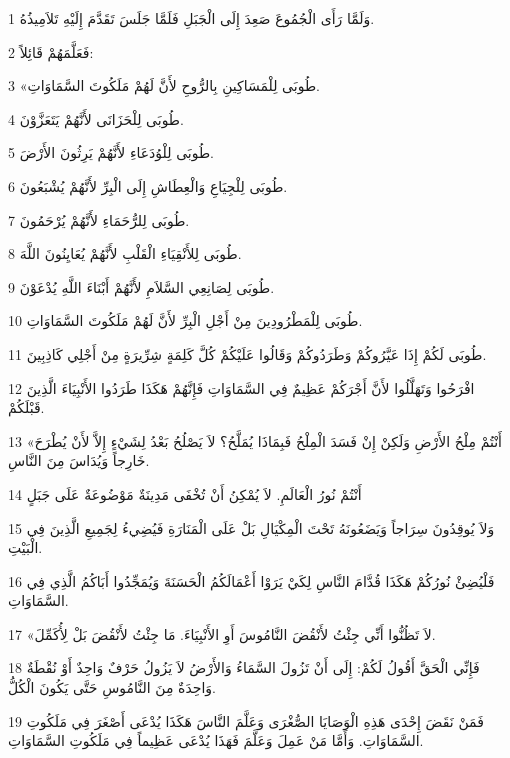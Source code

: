 \par 1 وَلَمَّا رَأَى الْجُمُوعَ صَعِدَ إِلَى الْجَبَلِ فَلَمَّا جَلَسَ تَقَدَّمَ إِلَيْهِ تَلاَمِيذُهُ.
\par 2 فَعَلَّمَهُمْ قَائِلاً:
\par 3 «طُوبَى لِلْمَسَاكِينِ بِالرُّوحِ لأَنَّ لَهُمْ مَلَكُوتَ السَّمَاوَاتِ.
\par 4 طُوبَى لِلْحَزَانَى لأَنَّهُمْ يَتَعَزَّوْنَ.
\par 5 طُوبَى لِلْوُدَعَاءِ لأَنَّهُمْ يَرِثُونَ الأَرْضَ.
\par 6 طُوبَى لِلْجِيَاعِ وَالْعِطَاشِ إِلَى الْبِرِّ لأَنَّهُمْ يُشْبَعُونَ.
\par 7 طُوبَى لِلرُّحَمَاءِ لأَنَّهُمْ يُرْحَمُونَ.
\par 8 طُوبَى لِلأَنْقِيَاءِ الْقَلْبِ لأَنَّهُمْ يُعَايِنُونَ اللَّهَ.
\par 9 طُوبَى لِصَانِعِي السَّلاَمِ لأَنَّهُمْ أَبْنَاءَ اللَّهِ يُدْعَوْنَ.
\par 10 طُوبَى لِلْمَطْرُودِينَ مِنْ أَجْلِ الْبِرِّ لأَنَّ لَهُمْ مَلَكُوتَ السَّمَاوَاتِ.
\par 11 طُوبَى لَكُمْ إِذَا عَيَّرُوكُمْ وَطَرَدُوكُمْ وَقَالُوا عَلَيْكُمْ كُلَّ كَلِمَةٍ شِرِّيرَةٍ مِنْ أَجْلِي كَاذِبِينَ.
\par 12 افْرَحُوا وَتَهَلَّلُوا لأَنَّ أَجْرَكُمْ عَظِيمٌ فِي السَّمَاوَاتِ فَإِنَّهُمْ هَكَذَا طَرَدُوا الأَنْبِيَاءَ الَّذِينَ قَبْلَكُمْ.
\par 13 «أَنْتُمْ مِلْحُ الأَرْضِ وَلَكِنْ إِنْ فَسَدَ الْمِلْحُ فَبِمَاذَا يُمَلَّحُ؟ لاَ يَصْلُحُ بَعْدُ لِشَيْءٍ إِلاَّ لأَنْ يُطْرَحَ خَارِجاً وَيُدَاسَ مِنَ النَّاسِ.
\par 14 أَنْتُمْ نُورُ الْعَالَمِ. لاَ يُمْكِنُ أَنْ تُخْفَى مَدِينَةٌ مَوْضُوعَةٌ عَلَى جَبَلٍ
\par 15 وَلاَ يُوقِدُونَ سِرَاجاً وَيَضَعُونَهُ تَحْتَ الْمِكْيَالِ بَلْ عَلَى الْمَنَارَةِ فَيُضِيءُ لِجَمِيعِ الَّذِينَ فِي الْبَيْتِ.
\par 16 فَلْيُضِئْ نُورُكُمْ هَكَذَا قُدَّامَ النَّاسِ لِكَيْ يَرَوْا أَعْمَالَكُمُ الْحَسَنَةَ وَيُمَجِّدُوا أَبَاكُمُ الَّذِي فِي السَّمَاوَاتِ.
\par 17 «لاَ تَظُنُّوا أَنِّي جِئْتُ لأَنْقُضَ النَّامُوسَ أَوِ الأَنْبِيَاءَ. مَا جِئْتُ لأَنْقُضَ بَلْ لِأُكَمِّلَ.
\par 18 فَإِنِّي الْحَقَّ أَقُولُ لَكُمْ: إِلَى أَنْ تَزُولَ السَّمَاءُ وَالأَرْضُ لاَ يَزُولُ حَرْفٌ وَاحِدٌ أَوْ نُقْطَةٌ وَاحِدَةٌ مِنَ النَّامُوسِ حَتَّى يَكُونَ الْكُلُّ.
\par 19 فَمَنْ نَقَضَ إِحْدَى هَذِهِ الْوَصَايَا الصُّغْرَى وَعَلَّمَ النَّاسَ هَكَذَا يُدْعَى أَصْغَرَ فِي مَلَكُوتِ السَّمَاوَاتِ. وَأَمَّا مَنْ عَمِلَ وَعَلَّمَ فَهَذَا يُدْعَى عَظِيماً فِي مَلَكُوتِ السَّمَاوَاتِ.
